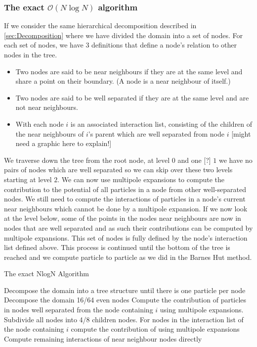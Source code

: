 \subsubsection{\texorpdfstring{The exact $\mathcal{O}(N\log N)$ algorithm}{The exact O(NlogN) algorithm}}
If we consider the same hierarchical decomposition described in \cref{sec:Decomposition} where we have divided the domain into a set of nodes. For each set of nodes, we have 3 definitions that define a node's relation to other nodes in the tree.
\begin{itemize}
    \item Two nodes are said to be near neighbours if they are at the same level and share a point on their boundary. (A node is a near neighbour of itself.)
    \item Two nodes are said to be well separated if they are at the same level and are not near neighbours.
    \item With each node $i$ is an associated interaction list, consisting of the children of the near neighbours of $i$’s parent which are well separated from node $i$ [might need a graphic here to explain!]
\end{itemize}
We traverse down the tree from the root node, at level $0$ and one [?] $1$ we have no pairs of nodes which are well separated so we can skip over these two levels starting at level $2$. We can now use multipole expansions to compute the contribution to the potential of all particles in a node from other well-separated nodes. We still need to compute the interactions of particles in a node's current near neighbours which cannot be done by a multipole expansion. If we now look at the level below, some of the points in the nodes near neighbours are now in nodes that are well separated and as such their contributions can be computed by multipole expansions. This set of nodes is fully defined by the node's interaction list defined above. This process is continued until the bottom of the tree is reached and we compute particle to particle as we did in the Barnes Hut method. 

\begin{algorithm}[ht]
\caption{The exact NlogN Algorithm}\label{alg:FMMNlogN}
\begin{algorithmic}
\State Decompose the domain into a tree structure until there is one particle per node
    \State Decompose the domain 16/64 even nodes
    \State Compute the contribution of particles in nodes well separated from the node
    \State \; containing $i$ using multipole expansions.
    \Repeat
        \State Subdivide all nodes into 4/8 children nodes.
        \State For nodes in the interaction list of the node containing $i$ compute the 
        \State \; contribution of using multipole expansions
    \State Compute remaining interactions of near neighbour nodes directly
\EndFor
\end{algorithmic}
\end{algorithm}

